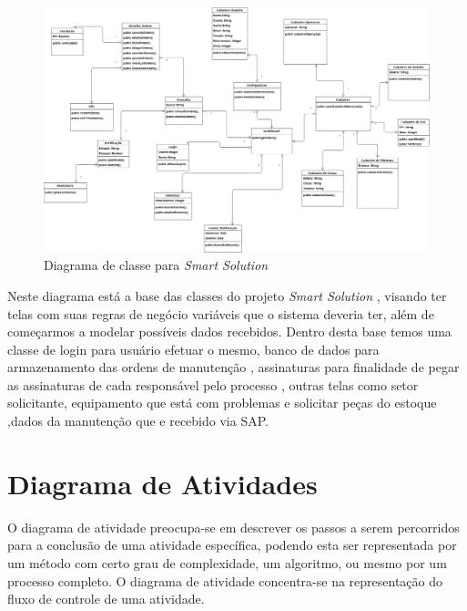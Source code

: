 \newpage
\begin{figure}[H]
	\caption{\label{Diagrama_de_classe_integrado}Diagrama de classe para \textit{Smart Solution}}
	\begin{center}
		\includegraphics[scale=0.35, angle=90]{./Figuras/Diagrama_de_classe_integrado}
		
	\end{center}
\end{figure}

\newpage

Neste diagrama está a base das classes do projeto\textit{ Smart Solution} , visando ter telas com suas regras de negócio variáveis que o sistema deveria ter, além de começarmos a modelar possíveis dados recebidos. Dentro desta base temos uma classe de login para usuário efetuar o mesmo, banco de dados para armazenamento das ordens de manutenção , assinaturas para finalidade de pegar as assinaturas de cada responsável pelo processo , outras telas como setor solicitante, equipamento que está com problemas e solicitar peças do estoque ,dados da manutenção que e recebido via SAP.

\newpage
\section{Diagrama de Atividades}


O diagrama de atividade
preocupa-se em descrever os passos a serem percorridos para a conclusão de uma
atividade específica, podendo esta ser representada por um método com certo
grau de complexidade, um algoritmo, ou mesmo por um processo completo. O
diagrama de atividade concentra-se na representação do fluxo de controle de
uma atividade.\cite{guedes2009uml}



